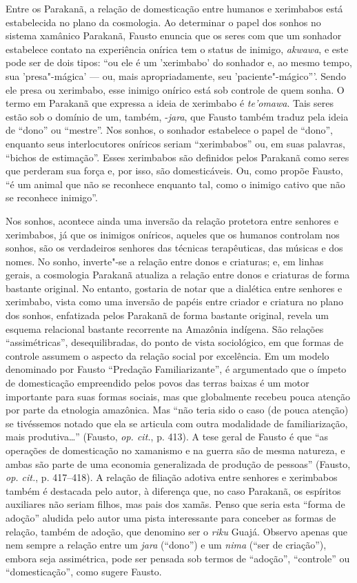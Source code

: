 Entre os Parakanã, a relação de domesticação entre humanos e xerimbabos
está estabelecida no plano da cosmologia. Ao determinar o papel dos
sonhos no sistema xamânico Parakanã, Fausto enuncia que os seres com que
um sonhador estabelece contato na experiência onírica tem o status de
inimigo, \emph{akwawa}, e este pode ser de dois tipos: ``ou ele é um
'xerimbabo' do sonhador e, ao mesmo tempo, sua 'presa"-mágica' --- ou, mais
apropriadamente, seu 'paciente"-mágico'''. Sendo ele presa ou xerimbabo,
esse inimigo onírico está sob controle de quem sonha. O termo em
Parakanã que expressa a ideia de xerimbabo é \emph{te'omawa}. Tais seres
estão sob o domínio de um, também, -\emph{jara}, que Fausto também
traduz pela ideia de ``dono'' ou ``mestre''. Nos sonhos, o sonhador
estabelece o papel de ``dono'', enquanto seus interlocutores oníricos
seriam ``xerimbabos'' ou, em suas palavras, ``bichos de estimação''. Esses
xerimbabos são definidos pelos Parakanã como seres que perderam sua
força e, por isso, são domesticáveis. Ou, como propõe Fausto, ``é um
animal que não se reconhece enquanto tal, como o inimigo cativo que não
se reconhece inimigo''.

Nos sonhos, acontece ainda uma inversão da relação protetora entre
senhores e xerimbabos, já que os inimigos oníricos, aqueles que os
humanos controlam nos sonhos, são os verdadeiros senhores das técnicas
terapêuticas, das músicas e dos nomes. No sonho, inverte"-se a relação
entre donos e criaturas; e, em linhas gerais, a cosmologia Parakanã
atualiza a relação entre donos e criaturas de forma bastante original.
No entanto, gostaria de notar que a dialética entre senhores e
xerimbabo, vista como uma inversão de papéis entre criador e criatura no
plano dos sonhos, enfatizada pelos Parakanã de forma bastante original,
revela um esquema relacional bastante recorrente na Amazônia indígena.
São relações ``assimétricas'', desequilibradas, do ponto de vista
sociológico, em que formas de controle assumem o aspecto da relação
social por excelência. Em um modelo denominado por Fausto ``Predação
Familiarizante'', é argumentado que o ímpeto de domesticação empreendido
pelos povos das terras baixas é um motor importante para suas formas
sociais, mas que globalmente recebeu pouca atenção por parte da
etnologia amazônica. Mas ``não teria sido o caso (de pouca atenção) se
tivéssemos notado que ela se articula com outra modalidade de
familiarização, mais produtiva\ldots{}'' (Fausto, \emph{op. cit.}, p. 413). A tese
geral de Fausto é que ``as operações de domesticação no xamanismo e na
guerra são de mesma natureza, e ambas são parte de uma economia
generalizada de produção de pessoas'' (Fausto, \emph{op. cit.}, p. 417--418). A
relação de filiação adotiva entre senhores e xerimbabos também é
destacada pelo autor, à diferença que, no caso Parakanã, os espíritos
auxiliares não seriam filhos, mas pais dos xamãs. Penso que seria esta
``forma de adoção'' aludida pelo autor uma pista interessante para
conceber as formas de relação, também de adoção, que denomino ser o
\emph{riku} Guajá. Observo apenas que nem sempre a relação entre um
\emph{jara} (``dono'') e um \emph{nima} (``ser de criação''), embora seja
assimétrica, pode ser pensada sob termos de ``adoção'', ``controle'' ou
``domesticação'', como sugere Fausto.

